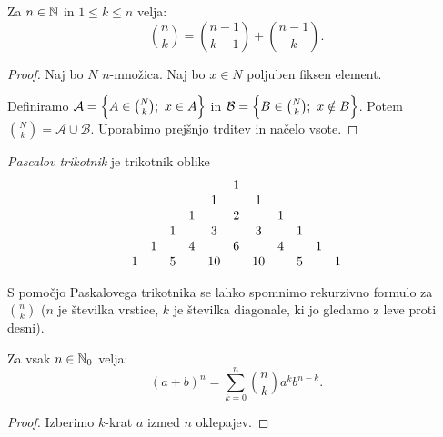 \begin{trditev}
    Za $n \in \mathbb{N}$ in $1 \leq k \leq n$ velja:
    $$\binom{n}{k} = \binom{n-1}{k-1} + \binom{n-1}{k}.$$
\end{trditev}

\begin{proof}
    Naj bo $N$ $n$-množica. Naj bo $x \in N$ poljuben fiksen element. 
    
    Definiramo $\mathcal{A} = \left\{A \in \binom{N}{k}; \ x \in A\right\}$ in $\mathcal{B} = \left\{B \in \binom{N}{k}; \ x \notin B\right\}$. Potem $\binom{N}{k} = \mathcal{A} \cup \mathcal{B}$. Uporabimo prejšnjo trditev in načelo vsote.
\end{proof}

\begin{definicija} 
    \emph{Pascalov trikotnik} je trikotnik oblike
    \[
    \setcounter{MaxMatrixCols}{20}   
    \begin{matrix}
        &&&&& 1 \\
        &&&& 1 && 1 \\
        &&& 1 && 2 && 1 \\
        && 1 && 3 && 3 && 1 \\
        & 1 && 4 && 6 && 4 && 1 \\
        1 && 5 && 10 && 10 && 5 && 1 

    \end{matrix}
    \]
\end{definicija}

\begin{opomba}
    S pomočjo Paskalovega trikotnika se lahko spomnimo rekurzivno formulo za $\binom{n}{k}$ ($n$ je številka vrstice, $k$ je številka diagonale, ki jo gledamo z leve proti desni).
\end{opomba}

\begin{izrek}
    Za vsak $n \in \mathbb{N}_0$ velja:
    $$(a+b)^n = \sum_{k=0}^{n} \binom{n}{k}a^kb^{n-k}.$$
\end{izrek}

\begin{proof}
    Izberimo $k$-krat $a$ izmed $n$ oklepajev.
\end{proof}

\newpage
